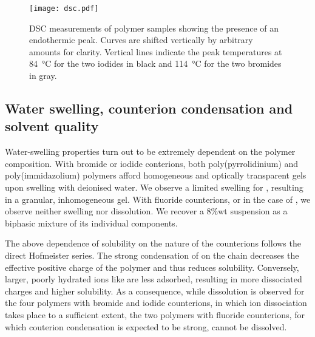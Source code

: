 \documentclass[journal=jacsat,manuscript=article]{achemso}
\begin{document}
\begin{figure}
\texttt{[image: dsc.pdf]}
\caption{DSC measurements of polymer samples showing the presence of an endothermic peak. Curves are shifted vertically by arbitrary amounts for clarity. Vertical lines indicate the peak temperatures at \SI{84}{\celsius} for the two iodides in black and \SI{114}{\celsius} for the two bromides in gray.}
\label{fig:dsc}
\end{figure}

\subsection{Water swelling, counterion condensation and solvent quality}
Water-swelling properties turn out to be extremely dependent on the polymer composition. With bromide or iodide conterions, both poly(pyrrolidinium) and poly(immidazolium) polymers afford homogeneous and optically transparent gels upon swelling with deionised water. We observe a limited swelling for , resulting in a granular, inhomogeneous gel. With fluoride counterions, or in the case of , we observe neither swelling nor dissolution. We recover a 8\%wt suspension as a biphasic mixture of its individual components.

The above dependence of solubility on the nature of the counterions follows the direct Hofmeister series. The strong condensation of  on the chain decreases the effective positive charge of the polymer and thus reduces solubility. Conversely, larger, poorly hydrated ions like  are less adsorbed, resulting in more dissociated charges and higher solubility. As a consequence, while dissolution is observed for the four polymers with bromide and iodide counterions, in which ion dissociation takes place to a sufficient extent, the two polymers with fluoride counterions, for which couterion condensation is expected to be strong, cannot be dissolved.
\end{document}
